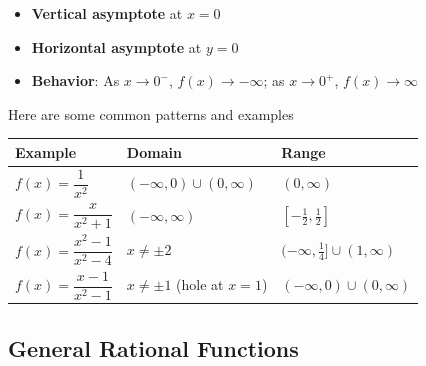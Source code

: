 \documentclass[../main-notes.tex]{subfile}
\begin{document}
\begin{itemize}
    \item \textbf{Vertical asymptote} at \( x = 0 \)
    \item \textbf{Horizontal asymptote} at \( y = 0 \)
    \item \textbf{Behavior}: As \( x \to 0^- \), \( f(x) \to -\infty \); as \( x \to 0^+ \), \( f(x) \to \infty \)
\end{itemize}

Here are some common patterns and examples
\begin{table}[h]
\centering
\renewcommand{\arraystretch}{1.5}
\begin{tabular}{@{}lll@{}}
\toprule
\textbf{Example} & \textbf{Domain} & \textbf{Range} \\ 
\midrule
\( f(x) = \dfrac{1}{x^2} \) & \( (-\infty, 0) \cup (0, \infty) \) & \( (0, \infty) \) \\
\( f(x) = \dfrac{x}{x^2 + 1} \) & \( (-\infty, \infty) \) & \( \left[-\frac{1}{2}, \frac{1}{2}\right] \) \\
\( f(x) = \dfrac{x^2 - 1}{x^2 - 4} \) & \( x \neq \pm 2 \) & \( (-\infty, \frac{1}{4}] \cup (1, \infty) \) \\
\( f(x) = \dfrac{x - 1}{x^2 - 1} \) & \( x \neq \pm 1 \) (hole at \( x=1 \)) & \( (-\infty, 0) \cup (0, \infty) \) \\
\bottomrule
\end{tabular}
\end{table}


\newpage

\subsection*{General Rational Functions}
\end{document}

